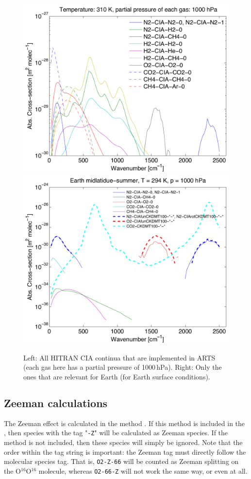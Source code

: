 \begin{figure}
 \begin{center}
  \includegraphics[width=.46\hsize]{plot_all_arts_cia_generic_1}
  \hspace{\fill}
  \includegraphics[width=.46\hsize]{plot_earth_continua_1_1}
  \caption{Left: All HITRAN CIA continua that are implemented in ARTS
    (each gas here has a partial pressure of 1000\,hPa). Right: Only
    the ones that are relevant for Earth (for Earth surface
    conditions).}
  \label{fig:absorption:cia}
 \end{center}
\end{figure}

\subsection{Zeeman calculations}
\label{sec:absorption:zeeman}

The Zeeman effect is calculated in the method .
If this method is included in the , then species with the
tag "\verb|-Z|" will be calculated as Zeeman species. If the method is not included,
then these species will simply be ignored. Note that the order within the tag
string is important: the Zeeman tag must directly follow the molecular species
tag. That is, \verb|O2-Z-66| will be counted as Zeeman splitting on the
O$^{16}$O$^{16}$ molecule, whereas \verb|O2-66-Z| will not work the same way, or even at all.

